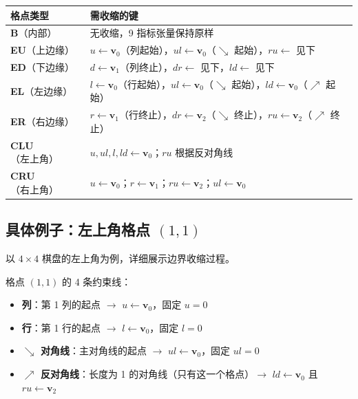 \documentclass[12pt,a4paper]{article}
\begin{document}
\begin{center}
\renewcommand{\arraystretch}{1.3}
\begin{tabular}{ll}
\toprule
格点类型 & 需收缩的键 \\
\midrule
\textbf{B}（内部） & 无收缩，9 指标张量保持原样 \\
\textbf{EU}（上边缘） & $u \leftarrow \mathbf{v}_0$（列起始），$ul \leftarrow \mathbf{v}_0$（$\searrow$ 起始），$ru \leftarrow$ 见下 \\
\textbf{ED}（下边缘） & $d \leftarrow \mathbf{v}_1$（列终止），$dr \leftarrow$ 见下，$ld \leftarrow$ 见下 \\
\textbf{EL}（左边缘） & $l \leftarrow \mathbf{v}_0$（行起始），$ul \leftarrow \mathbf{v}_0$（$\searrow$ 起始），$ld \leftarrow \mathbf{v}_0$（$\nearrow$ 起始） \\
\textbf{ER}（右边缘） & $r \leftarrow \mathbf{v}_1$（行终止），$dr \leftarrow \mathbf{v}_2$（$\searrow$ 终止），$ru \leftarrow \mathbf{v}_2$（$\nearrow$ 终止） \\
\textbf{CLU}（左上角） & $u, ul, l, ld \leftarrow \mathbf{v}_0$；$ru$ 根据反对角线 \\
\textbf{CRU}（右上角） & $u \leftarrow \mathbf{v}_0$；$r \leftarrow \mathbf{v}_1$；$ru \leftarrow \mathbf{v}_2$；$ul \leftarrow \mathbf{v}_0$ \\
\bottomrule
\end{tabular}
\end{center}

\subsection{具体例子：左上角格点 $(1,1)$}

以 $4 \times 4$ 棋盘的左上角为例，详细展示边界收缩过程。

格点 $(1,1)$ 的 4 条约束线：
\begin{itemize}
  \item \textbf{列}：第 1 列的起点 $\to$ $u \leftarrow \mathbf{v}_0$，固定 $u = 0$
  \item \textbf{行}：第 1 行的起点 $\to$ $l \leftarrow \mathbf{v}_0$，固定 $l = 0$
  \item \textbf{$\searrow$ 对角线}：主对角线的起点 $\to$ $ul \leftarrow \mathbf{v}_0$，固定 $ul = 0$
  \item \textbf{$\nearrow$ 反对角线}：长度为 1 的对角线（只有这一个格点）$\to$ $ld \leftarrow \mathbf{v}_0$ 且 $ru \leftarrow \mathbf{v}_2$
\end{itemize}
\end{document}
